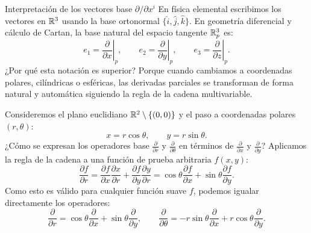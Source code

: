 \documentclass[11pt,letterpaper]{article}
\begin{document}
\begin{infobox}[orangeacc]{Interpretación de los vectores base $\partial / \partial x^i$}
En física elemental escribimos los vectores en $\mathbb{R}^3$ usando la base ortonormal $\{\hat{i}, \hat{j}, \hat{k}\}$. 
En geometría diferencial y cálculo de Cartan, la base natural del espacio tangente $\mathbb{R}^3_p$ es:
\[
e_1 = \left.\frac{\partial}{\partial x}\right|_p, \qquad e_2 = \left.\frac{\partial}{\partial y}\right|_p, \qquad e_3 = \left.\frac{\partial}{\partial z}\right|_p.
\]
¿Por qué esta notación es superior? Porque cuando cambiamos a coordenadas polares, cilíndricas o esféricas, las derivadas parciales se transforman de forma natural y automática siguiendo la regla de la cadena multivariable.
\end{infobox}


Consideremos el plano euclidiano $\mathbb{R}^2 \setminus \{(0,0)\}$ y el paso a coordenadas polares $(r, \theta)$:
\[
x = r\cos\theta, \qquad y = r\sin\theta.
\]
¿Cómo se expresan los operadores base $\frac{\partial}{\partial r}$ y $\frac{\partial}{\partial \theta}$ en términos de $\frac{\partial}{\partial x}$ y $\frac{\partial}{\partial y}$? Aplicamos la regla de la cadena a una función de prueba arbitraria $f(x, y)$:
\[
\frac{\partial f}{\partial r} = \frac{\partial f}{\partial x}\frac{\partial x}{\partial r} + \frac{\partial f}{\partial y}\frac{\partial y}{\partial r} = \cos\theta \frac{\partial f}{\partial x} + \sin\theta \frac{\partial f}{\partial y}.
\]
Como esto es válido para cualquier función suave $f$, podemos igualar directamente los operadores:
\[
\frac{\partial}{\partial r} = \cos\theta \frac{\partial}{\partial x} + \sin\theta \frac{\partial}{\partial y}, \qquad
\frac{\partial}{\partial \theta} = -r\sin\theta \frac{\partial}{\partial x} + r\cos\theta \frac{\partial}{\partial y}.
\]
\end{document}
